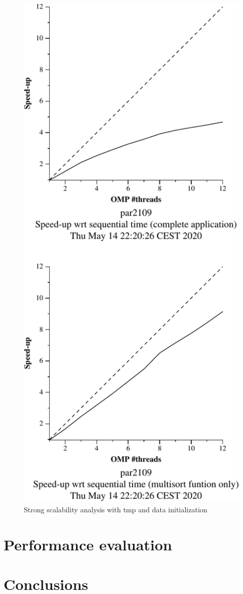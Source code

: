 \begin{figure}[H]
        \centering
        \includegraphics[width=0.35\linewidth]{plots/new-omp-tree-depen-opt-crop.pdf}
        \caption{Strong scalability analysis with tmp and data initialization}
        \label{fig:ssa_dep} 
\end{figure}

\section{Performance evaluation}%
\label{sec:perf_eval}

\section{Conclusions}%
\label{sec:conclusions}


